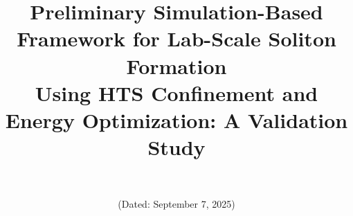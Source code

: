 \documentclass[12pt,a4paper]{article}
\begin{document}
\title{Preliminary Simulation-Based Framework for Lab-Scale Soliton Formation \\
Using HTS Confinement and Energy Optimization: A Validation Study}

\author{\authorname\\\texttt{\authoremail}}
\date{(Dated: September 7, 2025)}

\maketitle
\end{document}
